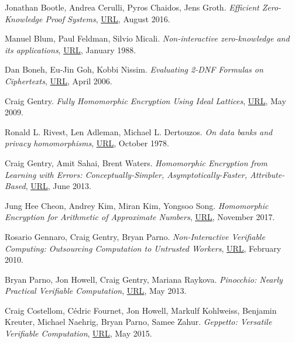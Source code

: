 \documentclass{Resources/UoBLab1}
\theoremstyle{definition}
\begin{document}
\begin{thebibliography}{10}
 Jonathan Bootle, Andrea Cerulli, Pyros Chaidos, Jens Groth. \textit{Efficient Zero-Knowledge Proof Systems}, \href{https://link.springer.com/chapter/10.1007/978-3-319-43005-8_1}{URL}, August 2016.

 Manuel Blum, Paul Feldman, Silvio Micali. \textit{Non-interactive zero-knowledge and its applications}, \href{https://doi.org/10.1145/62212.62222}{URL}, January 1988.

 Dan Boneh, Eu-Jin Goh, Kobbi Nissim. \textit{Evaluating 2-DNF Formulas on Ciphertexts}, \href{https://crypto.stanford.edu/~dabo/papers/2dnf.pdf}{URL}, April 2006.

 Craig Gentry. \textit{Fully Homomorphic Encryption Using Ideal Lattices}, \href{https://www.cs.cmu.edu/~odonnell/hits09/gentry-homomorphic-encryption.pdf}{URL}, May 2009.

 Ronald L. Rivest, Len Adleman, Michael L. Dertouzos. \textit{On data banks and privacy homomorphisms}, \href{https://luca-giuzzi.unibs.it/corsi/Support/papers-cryptography/RAD78.pdf}{URL}, October 1978.

 Craig Gentry, Amit Sahai, Brent Waters. \textit{Homomorphic Encryption from Learning with Errors: Conceptually-Simpler, Asymptotically-Faster, Attribute-Based}, \href{https://eprint.iacr.org/2013/340.pdf}{URL}, June 2013.

 Jung Hee Cheon, Andrey Kim, Miran Kim, Yongsoo Song. \textit{Homomorphic Encryption for Arithmetic of Approximate Numbers}, \href{https://link.springer.com/chapter/10.1007/978-3-319-70694-8_15}{URL}, November 2017.

 Rosario Gennaro, Craig Gentry, Bryan Parno. \textit{Non-Interactive Verifiable Computing: Outsourcing Computation to Untrusted Workers}, \href{https://eprint.iacr.org/2009/547.pdf}{URL}, February 2010.

 Bryan Parno, Jon Howell, Craig Gentry, Mariana Raykova. \textit{Pinocchio: Nearly Practical Verifiable Computation}, \href{https://eprint.iacr.org/2013/279.pdf}{URL}, May 2013.

 Craig Costellom, Cédric Fournet, Jon Howell, Markulf Kohlweiss, Benjamin Kreuter, Michael Naehrig, Bryan Parno, Samee Zahur. \textit{Geppetto: Versatile Verifiable Computation}, \href{https://ieeexplore.ieee.org/stamp/stamp.jsp?tp=&arnumber=7163030}{URL}, May 2015.


\end{thebibliography}
\end{document}
